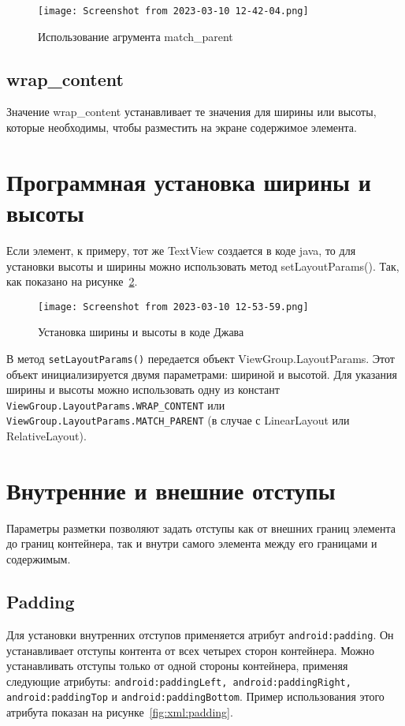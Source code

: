 \begin{figure}[h!tp]
	\centering
	\texttt{[image: Screenshot from 2023-03-10 12-42-04.png]}
	\caption{Использование агрумента match\_parent}
	\label{fig:xm:set:hw}
\end{figure}

\subsection{wrap\_content}
Значение wrap\_content устанавливает те значения для ширины или высоты,
которые необходимы, чтобы разместить на экране содержимое элемента.

\section{Программная установка ширины и высоты}
Если элемент, к примеру, тот же TextView создается в коде java, то для
установки высоты и ширины можно использовать метод setLayoutParams().
Так, как показано на рисунке~\ref{fig:java:set:hw}.

\begin{figure}[h!tp]
	\centering
	\texttt{[image: Screenshot from 2023-03-10 12-53-59.png]}
	\caption{Установка ширины и высоты в коде Джава}
	\label{fig:java:set:hw}
\end{figure}

В метод \texttt{setLayoutParams()} передается объект ViewGroup.LayoutParams.
Этот объект инициализируется двумя параметрами: шириной и высотой.
Для указания ширины и высоты можно использовать одну из констант
\texttt{ViewGroup.LayoutParams.WRAP\_CONTENT} или
\texttt{ViewGroup.LayoutParams.MATCH\_PARENT} (в случае с LinearLayout или
RelativeLayout).

\section{Внутренние и внешние отступы}
Параметры разметки позволяют задать отступы как от внешних границ
элемента до границ контейнера, так и внутри самого элемента между его
границами и содержимым.

\subsection{Padding}
Для установки внутренних отступов применяется атрибут
\texttt{android:padding}. Он устанавливает отступы контента от всех четырех
сторон контейнера. Можно устанавливать отступы только от одной стороны
контейнера, применяя следующие атрибуты:
\texttt{android:paddingLeft, android:paddingRight,
android:paddingTop} и \texttt{android:paddingBottom}.
Пример использования этого атрибута показан на рисунке~\ref{fig:xml:padding}.

